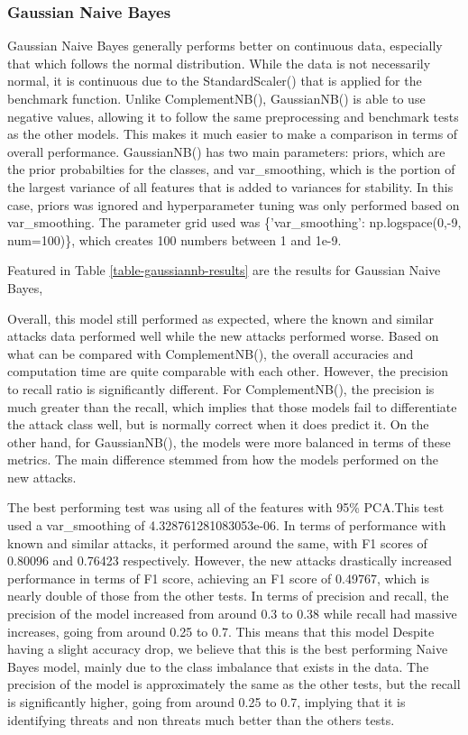 \subsubsection{Gaussian Naive Bayes}
Gaussian Naive Bayes generally performs better on continuous data, especially that which follows the normal distribution. While the data is not necessarily normal, it is continuous due to the StandardScaler() that is applied for the benchmark function. Unlike ComplementNB(), GaussianNB() is able to use negative values, allowing it to follow the same preprocessing and benchmark tests as the other models. This makes it much easier to make a comparison in terms of overall performance. GaussianNB() has two main parameters: priors, which are the prior probabilties for the classes, and var\_smoothing, which is the portion of the largest variance of all features that is added to variances for stability. In this case, priors was ignored and hyperparameter tuning was only performed based on var\_smoothing. The parameter grid used was \{'var\_smoothing': np.logspace(0,-9, num=100)\}, which creates 100 numbers between 1 and 1e-9.

Featured in Table \ref{table-gaussiannb-results} are the results for Gaussian Naive Bayes,


Overall, this model still performed as expected, where the known and similar attacks data performed well while the new attacks performed worse. Based on what can be compared with ComplementNB(), the overall accuracies and computation time are quite comparable with each other. However, the precision to recall ratio is significantly different. For ComplementNB(), the precision is much greater than the recall, which implies that those models fail to differentiate the attack class well, but is normally correct when it does predict it. On the other hand, for GaussianNB(), the models were more balanced in terms of these metrics. The main difference stemmed from how the models performed on the new attacks.

The best performing test was using all of the features with 95\% PCA.This test used a var\_smoothing of 4.328761281083053e-06. In terms of performance with known and similar attacks, it performed around the same, with F1 scores of 0.80096 and 0.76423 respectively. However, the new attacks drastically increased performance in terms of F1 score, achieving an F1 score of 0.49767, which is nearly double of those from the other tests. In terms of precision and recall, the precision of the model increased from around 0.3 to 0.38 while recall had massive increases, going from around 0.25 to 0.7. This means that this model Despite having a slight accuracy drop, we believe that this is the best performing Naive Bayes model, mainly due to the class imbalance that exists in the data. The precision of the model is approximately the same as the other tests, but the recall is significantly higher, going from around 0.25 to 0.7, implying that it is identifying threats and non threats much better than the others tests.

